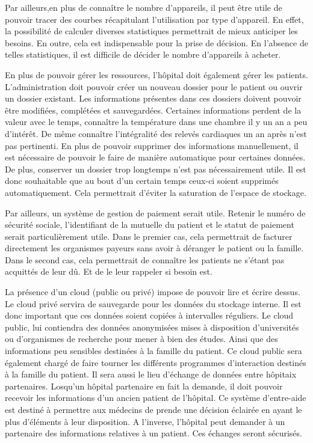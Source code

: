 Par ailleurs,en plus de connaître le nombre d'appareils, il peut être utile de pouvoir tracer des courbes récapitulant
l'utilisation par type d'appareil. En effet, la possibilité de calculer diverses statistiques permettrait de mieux anticiper les
besoins. En outre, cela est indispensable pour la prise de décision. En l'absence de telles statistiques, il est difficile de
décider le nombre d'appareils à acheter.  
\newline

En plus de pouvoir gérer les ressources, l'hôpital doit également gérer les patients. L'administration doit pouvoir créer un
nouveau dossier pour le patient ou ouvrir un dossier existant. Les informations présentes dans ces dossiers doivent pouvoir être
modifiées, complétées et sauvegardées. Certaines informations perdent de la valeur avec le temps, connaître la température dans
une chambre il y un an a peu d'intérêt. De même connaître l'intégralité des relevés cardiaques un an après n'est pas pertinenti. En
plus de pouvoir supprimer des informations manuellement, il est nécessaire de pouvoir le faire de manière automatique pour
certaines données. De plus, conserver un dossier trop longtemps n'est pas nécessairement utile. Il est donc souhaitable que au
bout d'un certain temps ceux-ci soient supprimés automatiquement. Cela permettrait d'éviter la saturation de l'espace de stockage.
\newline

Par ailleurs, un système de gestion de paiement serait utile. Retenir le numéro de sécurité sociale, l'identifiant de la mutuelle
du patient et le statut de paiement serait particulièrement utile. Dans le premier cas, cela permettrait de facturer directement
les organismes payeurs sans avoir à déranger le patient ou la famille. Dans le second cas, cela permettrait de connaître les
patients ne s'étant pas acquittés de leur dû. Et de le leur rappeler si besoin est.
\newline

La présence d'un cloud (public ou privé) impose de pouvoir lire et écrire dessus. Le cloud privé servira de sauvegarde pour les
données du stockage interne. Il est donc important que ces données soient copiées à intervalles réguliers. Le cloud public, lui
contiendra des données anonymisées mises à disposition d'universités ou d'organismes de recherche pour mener à bien des études.
Ainsi que des informations peu sensibles destinées à la famille du patient. Ce cloud public sera également chargé de faire tourner
les différents programmes d'interaction destinés à la famille du patient. Il sera aussi le lieu d'échange de données entre
hôpitaix partenaires. Losqu'un hôpital partenaire en fait la demande, il doit pouvoir recevoir les informations d'un ancien patient
de l'hôpital. Ce système d'entre-aide est destiné à permettre aux médecins de prende une décision éclairée en ayant le plus
d'éléments à leur disposition. A l'inverse, l'hôpital peut demander à un partenaire des informations relatives à un patient. Ces
échanges seront sécurisés.
\newline

